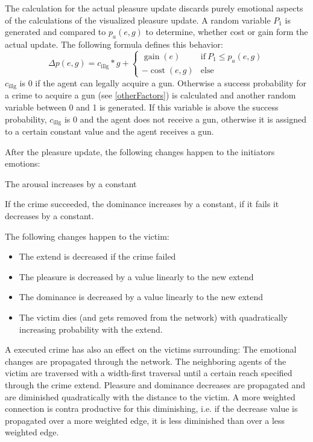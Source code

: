 \documentclass{JASSS}
\DeclareMathOperator{\cost}{cost}
\DeclareMathOperator{\gain}{gain}
\begin{document}
    The calculation for the actual pleasure update discards purely emotional aspects of the calculations of the visualized pleasure update. A random variable $P_1$ is generated and compared to $p_a(e,g)$ to determine, whether cost or gain form the actual update.
    The following formula defines this behavior:
    $$
    	\Delta p(e,g) = c_{\text{illg}}*g +
    	\begin{cases}
    		\gain(e) & \text{if}\ P_1 \leq p_a(e,g)\\
    		-\cost(e, g) & \text{else}
    	\end{cases}
    $$
    $c_{\text{illg}}$ is 0 if the agent can legally acquire a gun. Otherwise a success probability for a crime to acquire a gun (see \ref{otherFactors}) is calculated and another random variable between 0 and 1 is generated.
    If this variable is above the success probability, $c_{\text{illg}}$ is 0 and the agent does not receive a gun, otherwise it is assigned to a certain constant value and the agent receives a gun. \label{gunReceiving}

    After the pleasure update, the following changes happen to the initiators emotions:
    \begin{itemize*}
    	\item The arousal increases by a constant
    	\item If the crime succeeded, the dominance increases by a constant, if it fails it decreases by a constant.
    \end{itemize*}

    The following changes happen to the victim:
    \begin{itemize}
    	\item The extend is decreased if the crime failed
    	\item The pleasure is decreased by a value linearly to the new extend
    	\item The dominance is decreased by a value linearly to the new extend
    	\item The victim dies (and gets removed from the network) with quadratically increasing probability with the extend.
    \end{itemize}

    A executed crime has also an effect on the victims surrounding: The emotional changes are propagated through the network. The neighboring agents of the victim are traversed with a width-first traversal until a certain reach specified through the crime extend.
    Pleasure and dominance decreases are propagated and are diminished quadratically with the distance to the victim.
    A more weighted connection is contra productive for this diminishing, i.e. if the decrease value is propagated over a more weighted edge, it is less diminished than over a less weighted edge.
\end{document}
